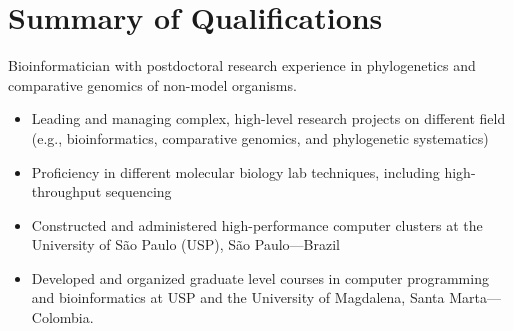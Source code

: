 
\vspace{-2.5em}

\section{Summary of Qualifications}
Bioinformatician with postdoctoral research experience in phylogenetics and comparative genomics of non-model organisms.
\begin{itemize}
    \item Leading and managing complex, high-level research projects on different field (e.g., bioinformatics, comparative genomics, and phylogenetic systematics)
    \item Proficiency in different molecular biology lab techniques, including high-throughput sequencing
    \item Constructed and administered high-performance computer clusters at the University of São Paulo (USP), São Paulo---Brazil
    \item Developed and organized graduate level courses in computer programming and bioinformatics at USP and the University of Magdalena, Santa Marta---Colombia.
\end{itemize}
